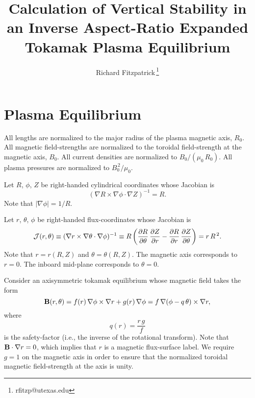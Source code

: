 \documentclass[12pt,prb,aps,notitlepage]{revtex4-1}
\begin{document}
\title{Calculation of Vertical Stability in an Inverse Aspect-Ratio Expanded Tokamak Plasma Equilibrium}
\author{Richard Fitzpatrick\,\footnote{rfitzp@utexas.edu}}
\maketitle

\section{Plasma Equilibrium}\label{geq}
All lengths  are normalized to  the major radius of the plasma magnetic axis, $R_0$. All magnetic field-strengths
are normalized to the  toroidal field-strength at the magnetic axis, $B_0$. All current densities are normalized to $B_0/(\mu_0\,R_0)$.  All plasma pressures are normalized to $B_0^{\,2}/\mu_0$.

Let $R$, $\phi$, $Z$ be right-handed cylindrical coordinates whose Jacobian 
is
\begin{equation}
(\nabla R\times \nabla\phi\cdot\nabla Z)^{-1} = R.
\end{equation}
Note that $|\nabla\phi|=1/R$. 

Let $r$, $\theta$, $\phi$ be right-handed flux-coordinates whose
Jacobian is
\begin{equation}\label{jac}
{\cal J}(r,\theta)\equiv (\nabla r\times \nabla\theta\cdot\nabla\phi)^{-1} \equiv R\left(\frac{\partial R}{\partial\theta}\,\frac{\partial Z}{\partial r} -\frac{\partial R}{\partial r}\,\frac{\partial Z}{\partial \theta}\right)= r\,R^{\,2}.
\end{equation}
Note that $r=r(R,Z)$ and $\theta=\theta(R,Z)$. 
The magnetic axis corresponds to $r=0$. The inboard mid-plane corresponds to $\theta=0$. 

Consider an axisymmetric tokamak equilibrium whose magnetic field takes the form
\begin{equation}
{\bf B}(r,\theta) = f(r)\,\nabla\phi\times \nabla r + g(r)\,\nabla\phi = f\,\nabla(\phi-q\,\theta)\times \nabla r,
\end{equation}
where
\begin{equation}\label{q}
q(r) = \frac{r\,g}{f}
\end{equation}
is the safety-factor (i.e., the inverse of the rotational transform). Note that ${\bf B}\cdot\nabla r=0$, which implies that $r$ is a magnetic flux-surface label.
We require $g=1$ on the magnetic axis in order to ensure that the normalized toroidal magnetic field-strength at the  axis is unity.  
\end{document}
